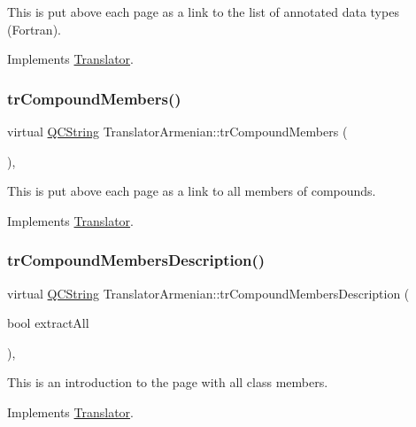 This is put above each page as a link to the list of annotated data types (Fortran). 

Implements \mbox{\hyperlink{class_translator}{Translator}}.

\mbox{\label{class_translator_armenian_a3dc74657189ab7fdfae42288a41b5807}} 
\subsubsection{\texorpdfstring{trCompoundMembers()}{trCompoundMembers()}}
{\footnotesize\ttfamily virtual \mbox{\hyperlink{class_q_c_string}{Q\+C\+String}} Translator\+Armenian\+::tr\+Compound\+Members (\begin{DoxyParamCaption}{ }\end{DoxyParamCaption})\hspace{0.3cm}{\ttfamily [inline]}, {\ttfamily [virtual]}}

This is put above each page as a link to all members of compounds. 

Implements \mbox{\hyperlink{class_translator}{Translator}}.

\mbox{\label{class_translator_armenian_aa4a108d474790d46c29f4769ba93724a}} 
\subsubsection{\texorpdfstring{trCompoundMembersDescription()}{trCompoundMembersDescription()}}
{\footnotesize\ttfamily virtual \mbox{\hyperlink{class_q_c_string}{Q\+C\+String}} Translator\+Armenian\+::tr\+Compound\+Members\+Description (\begin{DoxyParamCaption}\item[{bool}]{extract\+All }\end{DoxyParamCaption})\hspace{0.3cm}{\ttfamily [inline]}, {\ttfamily [virtual]}}

This is an introduction to the page with all class members. 

Implements \mbox{\hyperlink{class_translator}{Translator}}.

